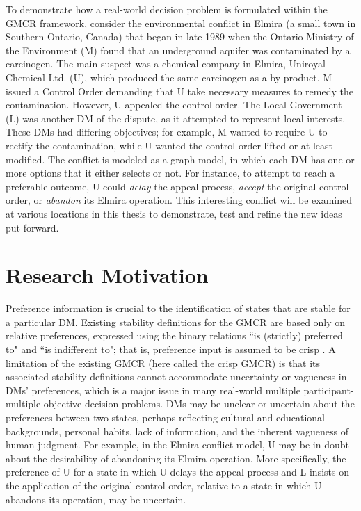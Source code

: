 To demonstrate how a real-world decision problem is formulated within the GMCR framework, consider the environmental conflict in Elmira (a small town in Southern Ontario, Canada) that began in late 1989 when the Ontario Ministry of the Environment (M) found that an underground aquifer was contaminated by a carcinogen. The main suspect was a chemical company in Elmira, Uniroyal Chemical Ltd. (U), which produced the same carcinogen as a by-product. M issued a Control Order demanding that U take necessary measures to remedy the contamination. However, U appealed the control order. The Local Government (L) was another DM of the dispute, as it attempted to represent local interests. These DMs had differing objectives; for example, M wanted to require U to rectify the contamination, while U wanted the control order lifted or at least modified. The conflict is modeled as a graph model, in which each DM has one or more options that it either selects or not. For instance, to attempt to reach a preferable outcome, U could \emph{delay} the appeal process, \emph{accept} the original control order, or \emph{abandon} its Elmira operation. This interesting conflict will be examined at various locations in this thesis to demonstrate, test and refine the new ideas put forward.





\section{Research Motivation}

Preference information is crucial to the identification of states that are stable for a particular DM. Existing stability definitions for the GMCR are based only on relative preferences, expressed using the binary relations ``is (strictly) preferred to" and ``is indifferent to"; that is, preference input is assumed to be crisp \citep{Fang-et-al1993}. A limitation of the existing GMCR (here called the crisp GMCR) is that its associated stability definitions cannot accommodate uncertainty or vagueness in DMs' preferences, which is a major issue in many real-world multiple participant-multiple objective decision problems. DMs may be unclear or uncertain about the preferences between two states, perhaps reflecting cultural and educational backgrounds, personal habits, lack of information, and the inherent vagueness of human judgment. For example, in the Elmira conflict model, U may be in doubt about the desirability of abandoning its Elmira operation. More specifically, the preference of U for a state in which U delays the appeal process and L insists on the application of the original control order, relative to a state in which U abandons its operation, may be uncertain.

